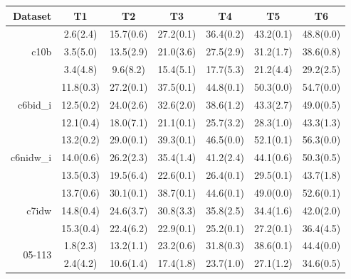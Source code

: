 \begin{table}[h]
    \footnotesize
    \centering
    \begin{tabular}[h]{rcccccc} \hline
      Dataset  &  T1 & T2 & T3  & T4 & T5 & T6\\ \hline
      \multirow{3}{*}{c10b}   &          2.6(2.4)   &     15.7(0.6)   &    27.2(0.1) &       36.4(0.2)   &    43.2(0.1)   &    48.8(0.0)    \\ 
      & 3.5(5.0)   &    13.5(2.9)     &  21.0(3.6)      &    27.5(2.9)  &        31.2(1.7)   &       38.6(0.8)       \\ 
      &  3.4(4.8)   &   9.6(8.2)   &        15.4(5.1)    &      17.7(5.3) &      21.2(4.4)    &   29.2(2.5)   \\ \hline
      \multirow{3}{*}{c6bid\_i}     &       11.8(0.3)    &   27.2(0.1)   &    37.5(0.1)    &   44.8(0.1)   &    50.3(0.0)    &   54.7(0.0)    \\ 
      & 12.5(0.2)   &    24.0(2.6)  &     32.6(2.0)     &     38.6(1.2)    &      43.3(2.7)    &      49.0(0.5)       \\ 
      & 12.1(0.4)  &      18.0(7.1)    &      21.1(0.1)    &      25.7(3.2)   &   28.3(1.0)   &    43.3(1.3)   \\ \hline
      \multirow{3}{*}{c6nidw\_i}     &   13.2(0.2)    &   29.0(0.1)    &   39.3(0.1)    &   46.5(0.0)   &    52.1(0.1)   &    56.3(0.0)    \\ 
      &  14.0(0.6)   &    26.2(2.3)    &   35.4(1.4)     &     41.2(2.4)   &       44.1(0.6)   &       50.3(0.5)       \\ 
      & 13.5(0.3)  &      19.5(6.4)   &       22.6(0.1)     &     26.4(0.1)   &   29.5(0.1)   &    43.7(1.8)   \\ \hline
      \multirow{3}{*}{c7idw}    &      13.7(0.6)    &   30.1(0.1)    &   38.7(0.1)   &    44.6(0.1)  &     49.0(0.0)   &    52.6(0.1)    \\ 
      & 14.8(0.4)    &   24.6(3.7)     &  30.8(3.3)   &       35.8(2.5)    &      34.4(1.6)     &     42.0(2.0)       \\ 
      & 15.3(0.4)  &      22.4(6.2)     &      22.9(0.1)      &    25.2(0.1) &     27.2(0.1)    &   36.4(4.5)   \\ \hline                             
      \multirow{3}{*}{05-113}     &       1.8(2.3)    &   13.2(1.1)     &  23.2(0.6)     &  31.8(0.3)    &   38.6(0.1)   &    44.4(0.0)    \\ 
      & 2.4(4.2)   &     10.6(1.4)     &  17.4(1.8)      &    23.7(1.0)    &      27.1(1.2)    &      34.6(0.5)       \\

\end{tabular}
\end{table}

